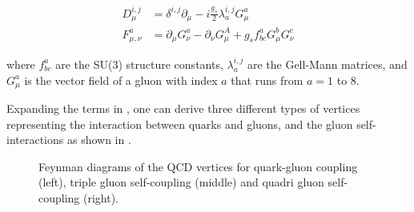 \begin{equation}
  \begin{split}
    D_{\mu}^{i,j}   &= \delta^{i,j}\partial_{\mu} - i\frac{g_{s}}{2}\lambda_{a}^{i,j}G^{a}_{\mu} \\
    F^{a}_{\mu,\nu} &= \partial_{\mu}G_{\nu}^{a}-\partial_{\nu}G_{\mu}^{A}+g_{s}f^{a}_{bc}G^{b}_{\mu}G^{c}_{\nu}
  \end{split}
\end{equation}

where $f^{a}_{bc}$ are the SU(3) structure constants, $\lambda_{a}^{i,j}$ are the Gell-Mann matrices, and $G^{a}_{\mu}$ is the vector field of a gluon with index $a$ that runs from $a=1$ to 8.

Expanding the terms in , one can derive three different types of vertices representing the interaction between quarks and gluons, and the gluon self-interactions as shown in .

\begin{figure}[!htbp]
  \vspace{10mm}
  \begin{center}
    \hspace*{1cm}
    \hspace*{1cm}
  \end{center}
  \caption{Feynman diagrams of the QCD vertices for quark-gluon coupling (left), triple gluon self-coupling (middle) and quadri gluon self-coupling (right).}
  \label{dia:QCDVertices}
\end{figure}

